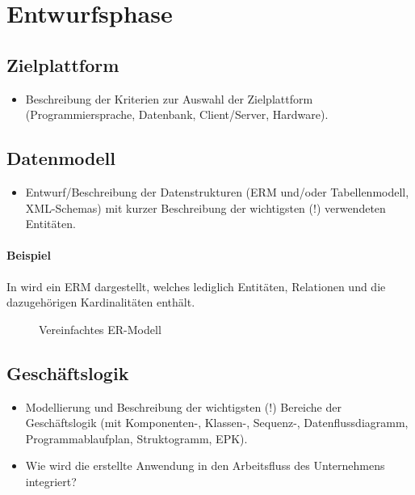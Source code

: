 \section{Entwurfsphase} 
\label{sec:Entwurfsphase}

\subsection{Zielplattform}
\label{sec:Zielplattform}

\begin{itemize}
	\item Beschreibung der Kriterien zur Auswahl der Zielplattform (\ua Programmiersprache, Datenbank, Client/Server, Hardware).
\end{itemize}


\subsection{Datenmodell}
\label{sec:Datenmodell}

\begin{itemize}
	\item Entwurf/Beschreibung der Datenstrukturen (\zB ERM und/oder Tabellenmodell, XML-Schemas) mit kurzer Beschreibung der wichtigsten (!) verwendeten Entitäten.
\end{itemize}

\paragraph{Beispiel}
In  wird ein ERM dargestellt, welches lediglich Entitäten, Relationen und die dazugehörigen Kardinalitäten enthält.

\begin{figure}[htb]
\centering
{}
\caption{Vereinfachtes ER-Modell}
\label{fig:ER}
\end{figure} 


\subsection{Geschäftslogik}
\label{sec:Geschaeftslogik}

\begin{itemize}
	\item Modellierung und Beschreibung der wichtigsten (!) Bereiche der Geschäftslogik (\zB mit Kom\-po\-nen\-ten-, Klassen-, Sequenz-, Datenflussdiagramm, Programmablaufplan, Struktogramm, EPK).
	\item Wie wird die erstellte Anwendung in den Arbeitsfluss des Unternehmens integriert?
\end{itemize}

